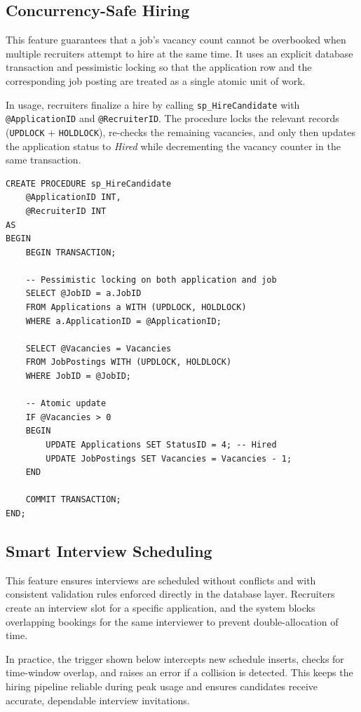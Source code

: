 \documentclass[11pt,a4paper]{article}
\begin{document}
\subsection{Concurrency-Safe Hiring}

\noindent
This feature guarantees that a job's vacancy count cannot be overbooked when multiple recruiters attempt to hire at the same time. It uses an explicit database transaction and pessimistic locking so that the application row and the corresponding job posting are treated as a single atomic unit of work.

In usage, recruiters finalize a hire by calling \texttt{sp\_HireCandidate} with \texttt{@ApplicationID} and \texttt{@RecruiterID}. The procedure locks the relevant records (\texttt{UPDLOCK} + \texttt{HOLDLOCK}), re-checks the remaining vacancies, and only then updates the application status to \textit{Hired} while decrementing the vacancy counter in the same transaction.


\begin{verbatim}
CREATE PROCEDURE sp_HireCandidate
    @ApplicationID INT,
    @RecruiterID INT
AS
BEGIN
    BEGIN TRANSACTION;
    
    -- Pessimistic locking on both application and job
    SELECT @JobID = a.JobID
    FROM Applications a WITH (UPDLOCK, HOLDLOCK)
    WHERE a.ApplicationID = @ApplicationID;
    
    SELECT @Vacancies = Vacancies
    FROM JobPostings WITH (UPDLOCK, HOLDLOCK)
    WHERE JobID = @JobID;
    
    -- Atomic update
    IF @Vacancies > 0
    BEGIN
        UPDATE Applications SET StatusID = 4; -- Hired
        UPDATE JobPostings SET Vacancies = Vacancies - 1;
    END
    
    COMMIT TRANSACTION;
END;
\end{verbatim}

\subsection{Smart Interview Scheduling}
\noindent
This feature ensures interviews are scheduled without conflicts and with consistent validation rules enforced directly in the database layer. Recruiters create an interview slot for a specific application, and the system blocks overlapping bookings for the same interviewer to prevent double-allocation of time.

In practice, the trigger shown below intercepts new schedule inserts, checks for time-window overlap, and raises an error if a collision is detected. This keeps the hiring pipeline reliable during peak usage and ensures candidates receive accurate, dependable interview invitations.
\end{document}
